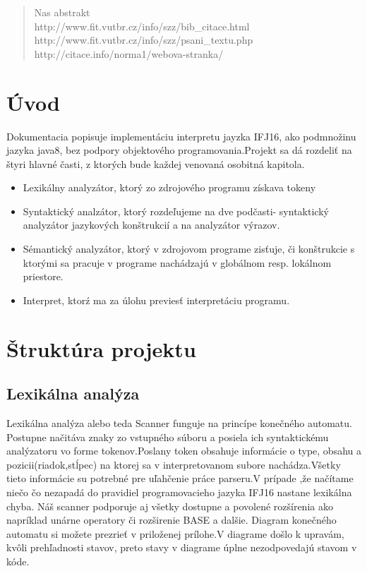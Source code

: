 \documentclass[12pt,a4paper]{report}
\begin{document}
\begin{abstract}
Nas abstrakt\\
http://www.fit.vutbr.cz/info/szz/bib\_citace.html\\
http://www.fit.vutbr.cz/info/szz/psani\_textu.php\\
http://citace.info/norma1/webova-stranka/
\end{abstract}

\tableofcontents

\chapter{Úvod}
Dokumentacia popisuje implementáciu interpretu jayzka IFJ16, ako podmnožinu jazyka java8, bez podpory objektového programovania.Projekt sa dá rozdeliť na štyri hlavné časti, z ktorých bude každej venovaná osobitná kapitola.

\begin{itemize}
\item Lexikálny analyzátor, ktorý zo zdrojového programu získava tokeny
\item Syntaktický analzátor, ktorý rozdeľujeme na dve podčasti- syntaktický analyzátor jazykových konštrukcií a na analyzátor výrazov.
\item Sémantický analyzátor, ktorý v zdrojovom programe zisťuje, či konštrukcie s ktorými sa pracuje v programe nachádzajú v globálnom resp. lokálnom priestore.
\item Interpret, ktorź ma za úlohu previesť interpretáciu programu.
\end{itemize}

\chapter{Štruktúra projektu}

\section{Lexikálna analýza}
Lexikálna analýza alebo teda Scanner funguje na princípe konečného automatu. Postupne načitáva  znaky zo vstupného súboru a posiela ich syntaktickému analýzatoru vo forme tokenov.Poslany token obsahuje informácie o type, obsahu a pozicii(riadok,stĺpec) na ktorej sa v interpretovanom subore nachádza.Všetky tieto informácie su potrebné pre uľahčenie práce parseru.V prípade ,že načítame niečo čo nezapadá do pravidiel programovacieho jazyka IFJ16 nastane lexikálna chyba. Náš scanner podporuje aj všetky dostupne a povolené rozšírenia ako napríklad unárne operatory či rozširenie BASE a dalšie. Diagram konečného automatu si možete prezrieť v priloženej prílohe.V diagrame došlo k  upravám, kvôli prehľadnosti stavov, preto stavy v diagrame úplne nezodpovedajú stavom v kóde.
\end{document}

